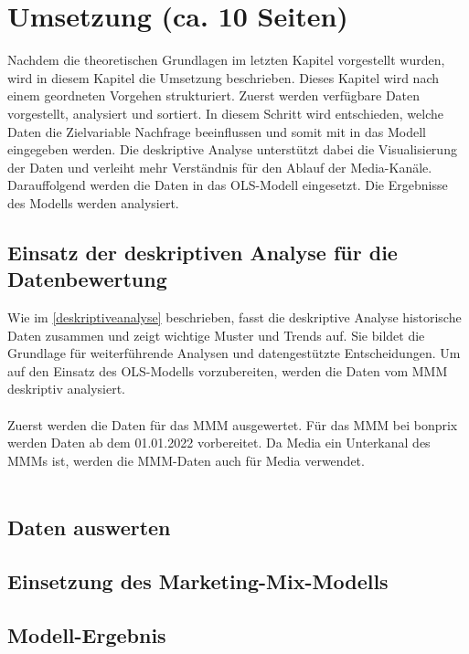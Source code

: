 \newpage
\section{Umsetzung (ca. 10 Seiten)}
Nachdem die theoretischen Grundlagen im letzten Kapitel vorgestellt wurden, wird in diesem Kapitel die Umsetzung beschrieben. Dieses Kapitel wird nach einem geordneten Vorgehen strukturiert. Zuerst werden verfügbare Daten vorgestellt, analysiert und sortiert. In diesem Schritt wird entschieden, welche Daten die Zielvariable Nachfrage beeinflussen und somit mit in das Modell eingegeben werden. Die deskriptive Analyse unterstützt dabei die Visualisierung der Daten und verleiht mehr Verständnis für den Ablauf der Media-Kanäle. Darauffolgend werden die Daten in das OLS-Modell eingesetzt. Die Ergebnisse des Modells werden analysiert.
\subsection{Einsatz der deskriptiven Analyse für die Datenbewertung}
Wie im \autoref{deskriptiveanalyse} beschrieben, fasst die deskriptive Analyse historische Daten zusammen und zeigt wichtige Muster und Trends auf. Sie bildet die Grundlage für weiterführende Analysen und datengestützte Entscheidungen. Um auf den Einsatz des OLS-Modells vorzubereiten, werden die Daten vom \ac{MMM} deskriptiv analysiert. \\\\
Zuerst werden die Daten für das \ac{MMM} ausgewertet. Für das \ac{MMM} bei bonprix werden Daten ab dem 01.01.2022 vorbereitet. Da Media ein Unterkanal des \ac{MMM}s ist, werden die \ac{MMM}-Daten auch für Media verwendet. \\\\

\subsection{Daten auswerten}
\subsection{Einsetzung des Marketing-Mix-Modells}
\subsection{Modell-Ergebnis}
